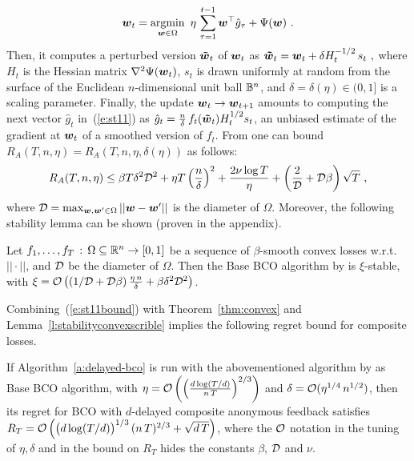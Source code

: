 %
\begin{equation}\label{e:st11}
\bw_t = \argmin_{\bw\in \Omega}\ \eta\,\sum_{\tau = 1}^{t-1} \bw^\top{\hat g_{\tau}} + \Psi(\bw)~.
\end{equation}
%
Then, it computes a perturbed version $\boldsymbol{{\tilde w}}_t$ of $\boldsymbol{w}_t$ as
\(
\boldsymbol{{\tilde w}}_t = \boldsymbol{w}_t + \delta H_t^{-1/2}\,s_t~,
\)
where $H_t$ is the Hessian matrix $\nabla^2 \Psi(\boldsymbol{w}_t)$, $s_t$ is drawn uniformly at random from the surface of the Euclidean $n$-dimensional unit ball $\mathbb{B}^n$, and $\delta = \delta(\eta) \in (0,1]$ is a scaling parameter. Finally, the update $\boldsymbol{w}_t \rightarrow \boldsymbol{w}_{t+1}$ amounts to computing the next vector ${\hat g_{t}}$ in~(\ref{e:st11}) as ${\hat g_{t}} = \frac{n}{\delta}\,f_t(\boldsymbol{{\tilde w}}_t)H_t^{1/2}s_t$,
an unbiased estimate of the gradient at $\boldsymbol{w}_t$ of a smoothed version
of $f_t$.
From \citep{st11} one can bound $R_A(T,n,\eta) = R_A(T,n,\eta,\delta(\eta))$ as follows:
%
\begin{equation}\label{e:st11bound}
R_A(T,n,\eta) \leq \beta T\delta^2\mathcal{D}^2 + \eta T\left(\frac{n}{\delta}\right)^2 + \frac{2\nu\log T}{\eta} + \left(\frac{2}{\mathcal{D}} + \mathcal{D}\beta\right)\sqrt{T}~,
\end{equation}
%
where $\mathcal{D} = \max_{\boldsymbol{w},\boldsymbol{w}'\in \Omega} ||\boldsymbol{w}-\boldsymbol{w}'||$ is the diameter of $\Omega$. Moreover, the following stability lemma can be shown (proven in the appendix).
%
\begin{lemma}\label{l:stabilityconvexscrible}
Let $f_1,\ldots,f_T\,:\,\Omega \subseteq \mathbb{R}^n \rightarrow [0, 1]$ be a sequence of $\beta$-smooth convex losses w.r.t. $||\cdot||$, and $\mathcal{D}$ be the diameter of $\Omega$. Then the Base BCO algorithm by \cite{st11} is $\xi$-stable, with
$
\xi = \mathcal{O}\left(\left(1/\mathcal{D} + \mathcal{D}\beta\right)\frac{\eta\,n}{\delta}  + \beta\delta^2\mathcal{D}^2\right)
$.
\end{lemma}
%
Combining~(\ref{e:st11bound}) with Theorem~\ref{thm:convex} and Lemma~\ref{l:stabilityconvexscrible} implies the following regret bound for composite losses.
%
\begin{corollary}\label{c:st11}
If Algorithm~\ref{a:delayed-bco} is run with the abovementioned algorithm by \citet{st11} as Base BCO algorithm, with $\eta = \mathcal{O}\left(\left(\frac{d\log (T/d)}{n\,T}\right)^{2/3}\right)$ and $\delta = \mathcal{O}(\eta^{1/4}\,n^{1/2})$, then its regret for BCO with $d$-delayed composite anonymous feedback satisfies
$
R_T = \mathcal{O}\left(\bigl(d\log (T/d)\bigl)^{1/3}\,(n\,T)^{2/3} + \sqrt{d\,T}\right)
$,
where the $\mathcal{O}$ notation in the tuning of $\eta,\delta$ and in the bound on $R_T$ hides the constants $\beta$, $\mathcal{D}$ and $\nu$.
\end{corollary}
